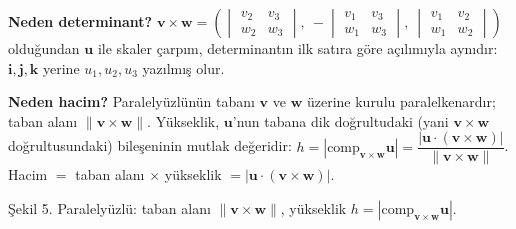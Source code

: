 \textbf{Neden determinant?} $\mathbf v\times\mathbf w=\left(\begin{vmatrix}v_2&v_3\\w_2&w_3\end{vmatrix},\ -\begin{vmatrix}v_1&v_3\\w_1&w_3\end{vmatrix},\ \begin{vmatrix}v_1&v_2\\w_1&w_2\end{vmatrix}\right)$ olduğundan $\mathbf u$ ile skaler çarpım, determinantın ilk satıra göre açılımıyla aynıdır: $\mathbf i,\mathbf j,\mathbf k$ yerine $u_1,u_2,u_3$ yazılmış olur.

\textbf{Neden hacim?} Paralelyüzlünün tabanı $\mathbf v$ ve $\mathbf w$ üzerine kurulu paralelkenardır; taban alanı $\|\mathbf v\times\mathbf w\|$. Yükseklik, $\mathbf u$'nun tabana dik doğrultudaki (yani $\mathbf v\times\mathbf w$ doğrultusundaki) bileşeninin mutlak değeridir: $h=|\text{comp}_{\mathbf v\times\mathbf w}\mathbf u|=\dfrac{|\mathbf u\cdot(\mathbf v\times\mathbf w)|}{\|\mathbf v\times\mathbf w\|}$. Hacim $=$ taban alanı $\times$ yükseklik $=|\mathbf u\cdot(\mathbf v\times\mathbf w)|$.

\begin{center}

{\small Şekil 5. Paralelyüzlü: taban alanı $\|\mathbf v\times\mathbf w\|$, yükseklik $h=|\text{comp}_{\mathbf v\times\mathbf w}\mathbf u|$.}
\end{center}

